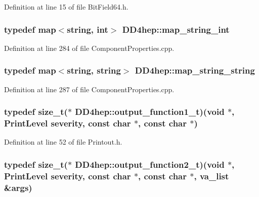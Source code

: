 Definition at line 15 of file BitField64.h.\hypertarget{namespace_d_d4hep_a5d68f9c863a419d5ed00cc08b473e352}{
\subsubsection[{map\_\-string\_\-int}]{\setlength{\rightskip}{0pt plus 5cm}typedef map$<${\bf string}, int$>$ {\bf DD4hep::map\_\-string\_\-int}}}
\label{namespace_d_d4hep_a5d68f9c863a419d5ed00cc08b473e352}


Definition at line 284 of file ComponentProperties.cpp.\hypertarget{namespace_d_d4hep_a0f6ae5793bad82d7e3c5a6fd76334cf1}{
\subsubsection[{map\_\-string\_\-string}]{\setlength{\rightskip}{0pt plus 5cm}typedef map$<${\bf string}, {\bf string}$>$ {\bf DD4hep::map\_\-string\_\-string}}}
\label{namespace_d_d4hep_a0f6ae5793bad82d7e3c5a6fd76334cf1}


Definition at line 287 of file ComponentProperties.cpp.\hypertarget{namespace_d_d4hep_ae75e3a861e057274d7f7bb67011ff3b4}{
\subsubsection[{output\_\-function1\_\-t}]{\setlength{\rightskip}{0pt plus 5cm}typedef size\_\-t($\ast$ {\bf DD4hep::output\_\-function1\_\-t})(void $\ast$, {\bf PrintLevel} severity, const char $\ast$, const char $\ast$)}}
\label{namespace_d_d4hep_ae75e3a861e057274d7f7bb67011ff3b4}


Definition at line 52 of file Printout.h.\hypertarget{namespace_d_d4hep_a782306f3df224bf6e5be62c498715cd1}{
\subsubsection[{output\_\-function2\_\-t}]{\setlength{\rightskip}{0pt plus 5cm}typedef size\_\-t($\ast$ {\bf DD4hep::output\_\-function2\_\-t})(void $\ast$, {\bf PrintLevel} severity, const char $\ast$, const char $\ast$, va\_\-list \&args)}}
\label{namespace_d_d4hep_a782306f3df224bf6e5be62c498715cd1}



